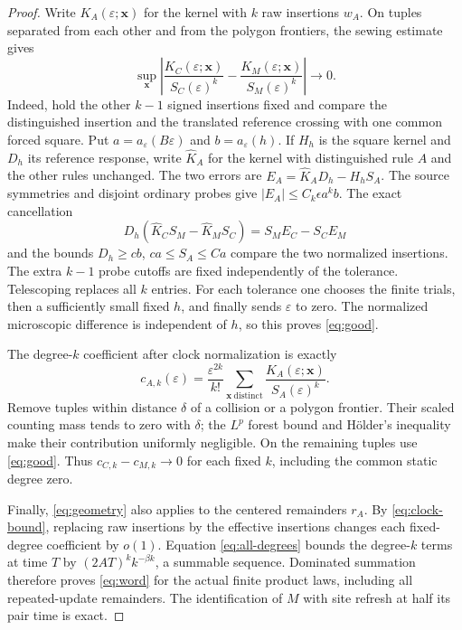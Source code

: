 \documentclass[11pt]{article}
\begin{document}
\begin{proof}
Write $K_A(\varepsilon;\boldsymbol x)$ for the kernel with $k$ raw
insertions $w_A$. On tuples separated from each other and from the
polygon frontiers, the sewing estimate gives
\begin{equation}\label{eq:good}
 \sup_{\boldsymbol x}
 \left|\frac{K_C(\varepsilon;\boldsymbol x)}{S_C(\varepsilon)^k}
       -\frac{K_M(\varepsilon;\boldsymbol x)}{S_M(\varepsilon)^k}\right|
       \longrightarrow0.
\end{equation}
Indeed, hold the other $k-1$ signed insertions fixed and compare the
distinguished insertion and the translated reference crossing with one
common forced square. Put $a=a_\varepsilon(B\varepsilon)$ and
$b=a_\varepsilon(h)$. If $H_h$ is the square kernel and $D_h$ its
reference response, write $\widehat K_A$ for the kernel with distinguished
rule $A$ and the other rules unchanged. The two errors are
$E_A=\widehat K_A D_h-H_h S_A$. The source symmetries and disjoint ordinary
probes give $|E_A|\leq C_k\epsilon a^k b$. The exact cancellation
\[
 D_h(\widehat K_C S_M-\widehat K_M S_C)=S_M E_C-S_C E_M
\]
and the bounds $D_h\geq cb$, $ca\leq S_A\leq Ca$ compare the two
normalized insertions. The extra $k-1$ probe cutoffs are fixed
independently of the tolerance. Telescoping replaces all $k$ entries.
For each tolerance one chooses the finite trials, then a sufficiently
small fixed $h$, and finally sends $\varepsilon$ to zero. The normalized
microscopic difference is independent of $h$, so this proves
\eqref{eq:good}.

The degree-$k$ coefficient after clock normalization is exactly
\begin{equation}\label{eq:coefficient}
 c_{A,k}(\varepsilon)=\frac{\varepsilon^{2k}}{k!}
  \sum_{\boldsymbol x\ \mathrm{distinct}}
       \frac{K_A(\varepsilon;\boldsymbol x)}{S_A(\varepsilon)^k}.
\end{equation}
Remove tuples within distance $\delta$ of a collision or a polygon
frontier. Their scaled counting mass tends to zero with $\delta$;
the $L^p$ forest bound and H\"older's inequality make their contribution
uniformly negligible. On the remaining tuples use \eqref{eq:good}.
Thus $c_{C,k}-c_{M,k}\to0$ for each fixed $k$, including the common
static degree zero.

Finally, \eqref{eq:geometry} also applies to the centered remainders
$r_A$. By \eqref{eq:clock-bound}, replacing raw insertions by the
effective insertions changes each fixed-degree coefficient by $o(1)$.
Equation \eqref{eq:all-degrees} bounds the degree-$k$ terms at time $T$
by $(2AT)^k k^{-\beta k}$, a summable sequence. Dominated summation
therefore proves \eqref{eq:word} for the actual finite product laws,
including all repeated-update remainders. The identification of $M$
with site refresh at half its pair time is exact.
\end{proof}
\end{document}
